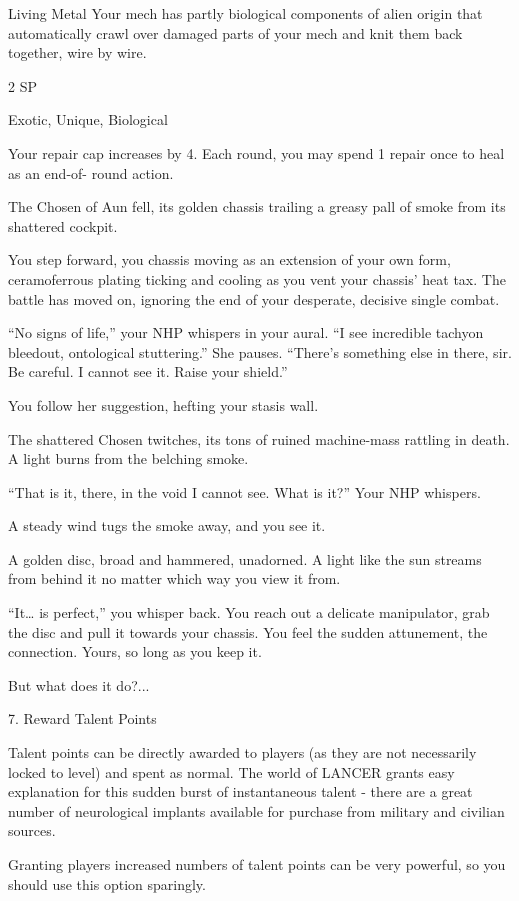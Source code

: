 Living Metal
Your mech has partly biological components of alien origin that automatically crawl over damaged
parts of your mech and knit them back together, wire by wire.




2 SP

Exotic, Unique, Biological

Your repair cap increases by 4. Each round, you may spend 1 repair once to heal as an end-of-
round action.


The Chosen of Aun fell, its golden chassis trailing a greasy pall of smoke from its shattered
cockpit.

You step forward, you chassis moving as an extension of your own form, ceramoferrous plating
ticking and cooling as you vent your chassis’ heat tax. The battle has moved on, ignoring the end
of your desperate, decisive single combat.

``No signs of life,'' your NHP whispers in your aural. ``I see incredible tachyon bleedout,
ontological stuttering.'' She pauses. ``There’s something else in there, sir. Be careful. I cannot see
it. Raise your shield.''

You follow her suggestion, hefting your stasis wall.

The shattered Chosen twitches, its tons of ruined machine-mass rattling in death. A light burns
from the belching smoke.

``That is it, there, in the void I cannot see. What is it?'' Your NHP whispers.

A steady wind tugs the smoke away, and you see it.

A golden disc, broad and hammered, unadorned. A light like the sun streams from behind it no
matter which way you view it from.

``It… is perfect,'' you whisper back. You reach out a delicate manipulator, grab the disc and pull it
towards your chassis. You feel the sudden attunement, the connection. Yours, so long as you
keep it.

But what does it do?...

7. Reward Talent Points

Talent points can be directly awarded to players (as they are not necessarily locked to level) and
spent as normal. The world of LANCER grants easy explanation for this sudden burst of
instantaneous talent - there are a great number of neurological implants available for purchase
from military and civilian sources.





Granting players increased numbers of talent points can be very powerful, so you should use this
option sparingly.

